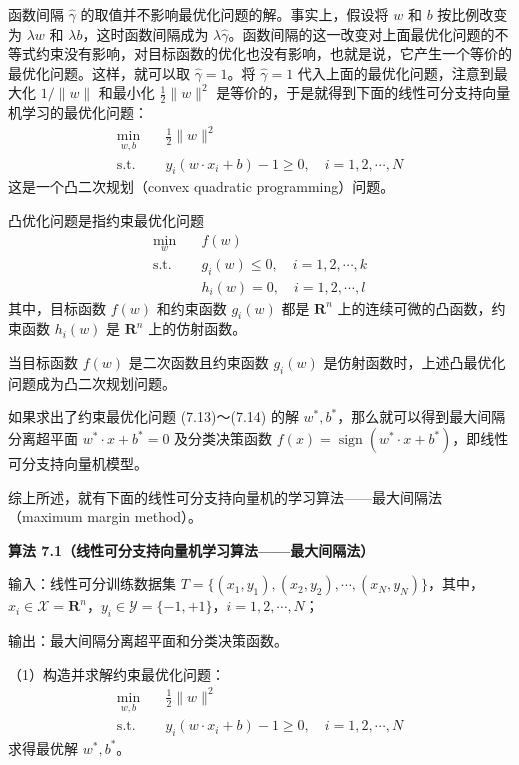 \documentclass[UTF8,12pt,a4paper,fontset=fandol]{ctexart}
\begin{document}
函数间隔 $\hat{\gamma}$ 的取值并不影响最优化问题的解。事实上，假设将 $w$ 和 $b$ 按比例改变为 $\lambda w$ 和 $\lambda b$，这时函数间隔成为 $\lambda\hat{\gamma}$。函数间隔的这一改变对上面最优化问题的不等式约束没有影响，对目标函数的优化也没有影响，也就是说，它产生一个等价的最优化问题。这样，就可以取 $\hat{\gamma}=1$。将 $\hat{\gamma}=1$ 代入上面的最优化问题，注意到最大化 $1/\|w\|$ 和最小化 $\frac{1}{2}\|w\|^2$ 是等价的，于是就得到下面的线性可分支持向量机学习的最优化问题：
\begin{equation}
\begin{aligned}
\min_{w,b}\quad & \frac{1}{2}\|w\|^2\\
\mathrm{s.t.}\quad & y_i(w\cdot x_i+b)-1\geq 0,\quad i=1,2,\cdots,N
\end{aligned}
\tag{7.13--7.14}
\end{equation}
这是一个凸二次规划（convex quadratic programming）问题。

凸优化问题是指约束最优化问题
\begin{equation}
\begin{aligned}
\min_w\quad & f(w)\\
\mathrm{s.t.}\quad & g_i(w)\leq 0,\quad i=1,2,\cdots,k\\
& h_i(w)=0,\quad i=1,2,\cdots,l
\end{aligned}
\tag{7.15--7.17}
\end{equation}
其中，目标函数 $f(w)$ 和约束函数 $g_i(w)$ 都是 $\mathbf{R}^n$ 上的连续可微的凸函数，约束函数 $h_i(w)$ 是 $\mathbf{R}^n$ 上的仿射函数。

当目标函数 $f(w)$ 是二次函数且约束函数 $g_i(w)$ 是仿射函数时，上述凸最优化问题成为凸二次规划问题。

如果求出了约束最优化问题 (7.13)～(7.14) 的解 $w^*,b^*$，那么就可以得到最大间隔分离超平面 $w^*\cdot x+b^*=0$ 及分类决策函数 $f(x)=\operatorname{sign}(w^*\cdot x+b^*)$，即线性可分支持向量机模型。

综上所述，就有下面的线性可分支持向量机的学习算法——最大间隔法（maximum margin method）。

\noindent\textbf{算法 7.1（线性可分支持向量机学习算法——最大间隔法）}

输入：线性可分训练数据集 $T=\{(x_1,y_1),(x_2,y_2),\cdots,(x_N,y_N)\}$，其中，$x_i\in\mathcal{X}=\mathbf{R}^n$，$y_i\in\mathcal{Y}=\{-1,+1\}$，$i=1,2,\cdots,N$；

输出：最大间隔分离超平面和分类决策函数。

（1）构造并求解约束最优化问题：
\[
\begin{aligned}
\min_{w,b}\quad & \frac{1}{2}\|w\|^2\\
\mathrm{s.t.}\quad & y_i(w\cdot x_i+b)-1\geq 0,\quad i=1,2,\cdots,N
\end{aligned}
\]
求得最优解 $w^*,b^*$。
\end{document}

